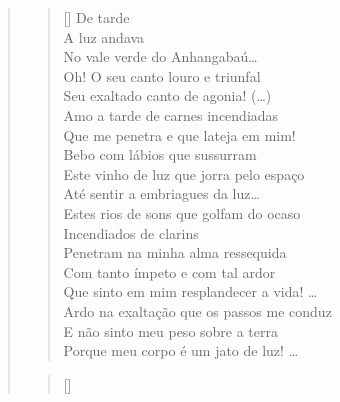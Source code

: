 \begin{refsection}
    \begin{quotation}
        \settowidth{\versewidth}{Bebo com lábios que sussurram}
        \noindent\begin{verse}[\versewidth]
            De tarde\\
            A luz andava\\
            No vale verde do Anhangabaú\dots\\
            Oh! O seu canto louro e triunfal\\
            Seu exaltado canto de agonia! (\dots)\\
            Amo a tarde de carnes incendiadas\\
            Que me penetra e que lateja em mim!\\
            Bebo com lábios que sussurram\\
            Este vinho de luz que jorra pelo espaço\\
            Até sentir a embriagues da luz\dots\\
            Estes rios de sons que golfam do ocaso\\
            Incendiados de clarins\\
            Penetram na minha alma ressequida\\
            Com tanto ímpeto e com tal ardor\\
            Que sinto em mim resplandecer a vida! \dots\\
            Ardo na exaltação que os passos me conduz\\
            E não sinto meu peso sobre a terra\\
            Porque meu corpo é um jato de luz! \dots
        \end{verse}

        \noindent\begin{verse}[\versewidth]
            \cite[p.~40--41]{Aranha1984Cocktails}
        \end{verse}
    \end{quotation}


\end{refsection}
